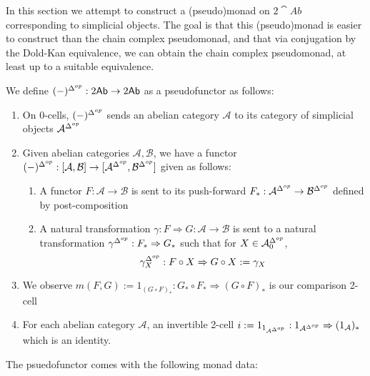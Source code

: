 
In this section we attempt to construct a (pseudo)monad on $2\cat{Ab}$ corresponding to simplicial objects. The goal is that this (pseudo)monad is easier to construct than the chain complex pseudomonad, and that via conjugation by the Dold-Kan equivalence, we can obtain the chain complex pseudomonad, at least up to a suitable equivalence.

We define $(-)^{\Delta^{op}}:2\textup{\textsf{Ab}}\rightarrow2\textup{\textsf{Ab}}$ as a pseudofunctor as follows:
\begin{enumerate}
    \item On 0-cells, $(-)^{\Delta^{op}}$ sends an abelian category $\mathcal{A}$ to its category of simplicial objects $\mathcal{A}^{\Delta^{op}}$
    \item Given abelian categories $\mathcal{A},\mathcal{B}$, we have a functor $(-)^{\Delta^{op}}:[\mathcal{A},\mathcal{B}]\rightarrow [\mathcal{A}^{\Delta^{op}},\mathcal{B}^{\Delta^{op}}]$ given as follows:
    \begin{enumerate}
        \item A functor $F:\mathcal{A}\rightarrow \mathcal{B}$ is sent to its push-forward $F_* :\mathcal{A}^{\Delta^{op}}\rightarrow \mathcal{B}^{\Delta^{op}}$ defined by post-composition
        \item A natural transformation $\gamma:F\Rightarrow G:\mathcal{A}\rightarrow \mathcal{B}$ is sent to a natural transformation $\gamma^{\Delta^{op}}:F_*\Rightarrow G_*$ such that for $X \in \mathcal{A}^{\Delta^{op}}_0$,
        \begin{equation*}
            \gamma^{\Delta^{op}}_X:F\circ X\Rightarrow G\circ X := \gamma_X
        \end{equation*}
    \end{enumerate}
    \item We observe $m(F,G) := 1_{(G\circ F)_*}:G_*\circ F_*\Rightarrow (G\circ F)_*$ is our comparison 2-cell
    \item For each abelian category $\mathcal{A}$, an invertible 2-cell $i:= 1_{1_{\mathcal{A}^{\Delta^{op}}}}:1_{\mathcal{A}^{\Delta^{op}}}\Rightarrow (1_\mathcal{A})_*$ which is an identity.
\end{enumerate}
The psuedofunctor comes with the following monad data:

